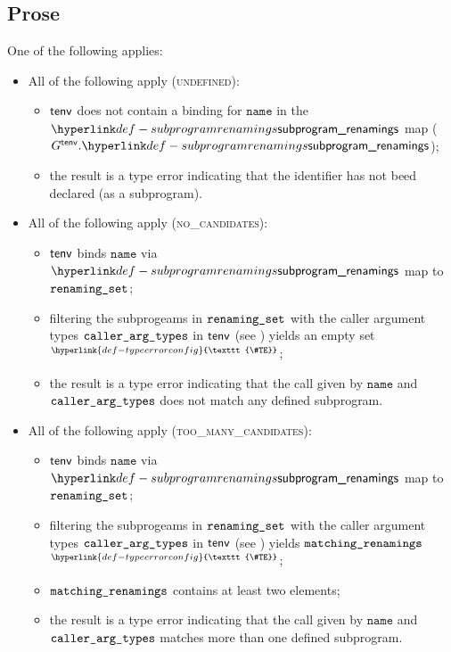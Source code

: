 \documentclass{book}
\newcommand\TypeErrorConfig[0]{\hyperlink{def-typeerrorconfig}{\texttt{\#TE}}}
\newcommand\ProseOrTypeError[0]{\hyperlink{def-proseortypeerror}{$^{\TypeErrorConfig}$}}
\newcommand\name[0]{\texttt{name}}
\begin{document}
\subsection{Prose}
One of the following applies:
\begin{itemize}
  \item All of the following apply (\textsc{undefined}):
  \begin{itemize}
    \item $\textsf{tenv}$ does not contain a binding for $\name$ in the $\subprogramrenamings$ map
          ($G^\tenv.\subprogramrenamings$);
    \item the result is a type error indicating that the identifier has not beed declared (as a subprogram).
  \end{itemize}

  \item All of the following apply (\textsc{no\_candidates}):
  \begin{itemize}
    \item $\textsf{tenv}$ binds $\name$ via $\subprogramrenamings$ map to $\texttt{renaming\_set}$;
    \item filtering the subprogeams in $\texttt{renaming\_set}$ with the caller argument types $\texttt{caller\_arg\_types}$
          in $\textsf{tenv}$ (see ) yields an empty set \ProseOrTypeError;
    \item the result is a type error indicating that the call given by $\name$ and \\ $\texttt{caller\_arg\_types}$
          does not match any defined subprogram.
  \end{itemize}

  \item All of the following apply (\textsc{too\_many\_candidates}):
  \begin{itemize}
    \item $\textsf{tenv}$ binds $\name$ via $\subprogramrenamings$ map to $\texttt{renaming\_set}$;
    \item filtering the subprogeams in $\texttt{renaming\_set}$ with the caller argument types $\texttt{caller\_arg\_types}$
          in $\textsf{tenv}$ (see ) yields $\texttt{matching\_renamings}$ \ProseOrTypeError;
    \item $\texttt{matching\_renamings}$ contains at least two elements;
    \item the result is a type error indicating that the call given by $\name$ and \\
          $\texttt{caller\_arg\_types}$ matches more than one defined subprogram.
  \end{itemize}


\end{itemize}
\end{document}
